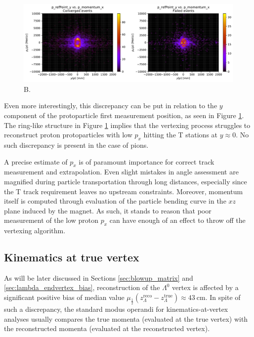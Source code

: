 \begin{figure}[t]
	\centering
	\includegraphics[width=\textwidth]{graphics/03-vertex_reconstruction/pp_p_refPoint_y_vs_p_momentum_x.pdf}
	\caption{B.}
	\label{fig:pp_p_px_vs_refpy_conv_vs_failed}
\end{figure}

Even more interestingly, this discrepancy can be put in relation to the $y$ component of the protoparticle first measurement position, as seen in Figure \ref{fig:pp_p_px_vs_refpy_conv_vs_failed}.
The ring-like structure in Figure \ref{fig:pp_p_px_vs_refpy_conv_vs_failed} implies that the vertexing process struggles to reconstruct proton protoparticles with low $p_x$ hitting the T stations at $y\approx 0$.
No such discrepancy is present in the case of pions.

A precise estimate of $p_x$ is of paramount importance for correct track measurement and extrapolation.
Even slight mistakes in angle assessment are magnified during particle transportation through long distances, especially since the T track requirement leaves no upstream constraints.
Moreover, momentum itself is computed through evaluation of the particle bending curve in the $xz$ plane induced by the magnet.
As such, it stands to reason that poor measurement of the low proton $p_x$ can have enough of an effect to throw off the vertexing algorithm.

\subsection{Kinematics at true vertex}
As will be later discussed in Sections \ref{sec:blowup_matrix} and \ref{sec:lambda_endvertex_bias}, reconstruction of the $\Lambda^0$ vertex is affected by a significant positive bias of median value $\mu_\frac{1}{2} \left(z_\Lambda^\text{reco} - z_\Lambda^\text{true}\right) \approx \SI{43}{\centi\meter}$.
In spite of such a discrepancy, the standard modus operandi for kinematics-at-vertex analyses usually compares the true momenta (evaluated at the true vertex) with the reconstructed momenta (evaluated at the reconstructed vertex).

